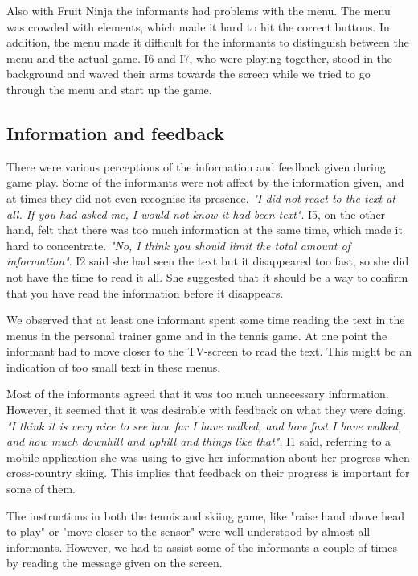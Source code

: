 Also with Fruit Ninja the informants had problems with the menu. The menu was crowded with elements, which made it hard to hit the correct buttons. In addition, the menu made it difficult for the informants to distinguish between the menu and the actual game. I6 and I7, who were playing together, stood in the background and waved their arms towards the screen while we tried to go through the menu and start up the game. 

\subsection{Information and feedback}
There were various perceptions of the information and feedback given during game play. Some of the informants were not affect by the information given, and at times they did not even recognise its presence. \emph{"I did not react to the text at all. If you had asked me, I would not know it had been text"}. I5, on the other hand, felt that there was too much information at the same time, which made it hard to concentrate. \emph{"No, I think you should limit the total amount of information"}.  I2 said she had seen the text but it disappeared too fast, so she did not have the time to read it all. She suggested that it should be a way to confirm that you have read the information before it disappears. 

We observed that at least one informant spent some time reading the text in the menus in the personal trainer game and in the tennis game. At one point the informant had to move closer to the TV-screen to read the text. This might be an indication of too small text in these menus. 

Most of the informants agreed that it was too much unnecessary information. However, it seemed that it was desirable with feedback on what they were doing. \emph{"I think it is very nice to see how far I have walked, and how fast I have walked, and how much downhill and uphill and things like that"}, I1 said, referring to a mobile application she was using to give her information about her progress when cross-country skiing. This implies that feedback on their progress is important for some of them.  

The instructions in both the tennis and skiing game, like "raise hand above head to play" or "move closer to the sensor" were well understood by almost all informants. However, we had to assist some of the informants a couple of times by reading the message given on the screen. 

